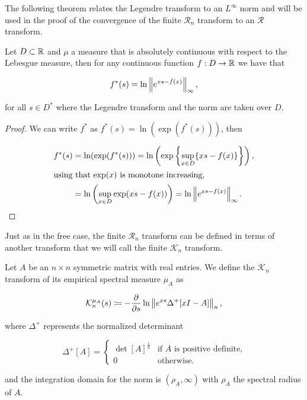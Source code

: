     The following theorem relates the Legendre transform to an $L^\infty$ norm and will be used in the proof of the convergence of the finite $\mathcal R_n$ transform to an $\mathcal R$ transform.

\begin{lemma} \label{lemma:legendre_transform_norm}
    Let $D \subset \mathbb R$ and $\mu$ a measure that is absolutely continuous with respect to the Lebesgue measure, then for any continuous function $f: D \to \mathbb R$ we have that

    \begin{equation*}
        f^*(s) = \ln \left\lVert e^{xs - f(x)} \right\rVert_{\infty},
    \end{equation*}

    \noindent for all $s \in D^*$ where the Legendre transform and the norm are taken over $D$.
\end{lemma}

\begin{proof}
    We can write $f^*$ as $f^*(s) = \ln(\exp(f^*(s)))$, then

    \begin{align*}
        f^*(s) &= \ln(\exp(f^*(s))) = \ln \left(\exp\left\{ \sup_{x\in D} \{xs-f(x)\} \right\}\right), \\
        \intertext{using that $\exp(x)$ is monotone increasing,}
        &= \ln \left( \sup_{x \in D} \exp(xs - f(x))\right) = \ln \left\lVert e^{xs-f(x)} \right\rVert_{\infty}.
    \end{align*}
\end{proof}


Just as in the free case, the finite $\mathcal R_n$ transform can be defined in terms of another transform that we will call the finite $\mathcal K_n$ transform.


\begin{definition}
    Let $A$ be an $n\times n$ symmetric matrix with real entries. We define the $\mathcal K_n$ transform of its empirical spectral measure $\mu_A$ as 

    \begin{equation*}
        \mathcal K_n^{\mu_A} (s) \coloneqq - \frac{\partial}{\partial s} \ln \left\lVert e^{xs} \Delta^+ [x I - A] \right\rVert_n,
    \end{equation*}

    \noindent where $\Delta^+$ represents the normalized determinant
    
    \begin{equation*}
        \Delta^+[A] = \left\{ \begin{array}{cc}
            \det[A]^{\frac1n} & \text{if $A$ is positive definite,}\\
            0 & \text{otherwise.}
        \end{array} \right.
    \end{equation*}
    
    \noindent and the integration domain for the norm is $(\rho_A, \infty)$ with $\rho_A$ the spectral radius of $A$.
\end{definition}

